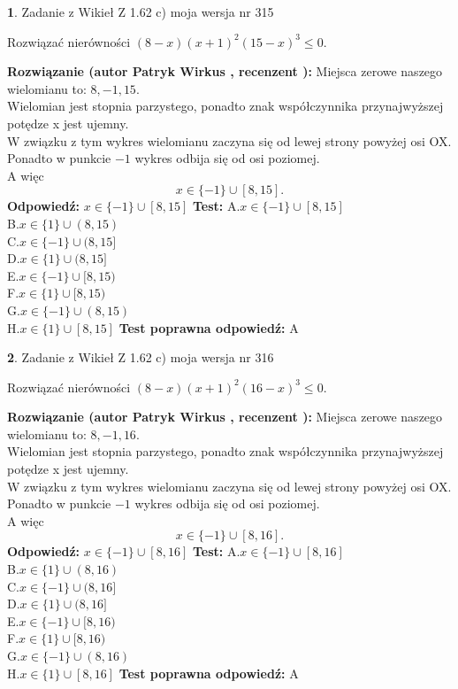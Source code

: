 \documentclass[12pt, a4paper]{article}
\theoremstyle{definition} %
\newtheorem{zad}{}
\newcommand{\zadStart}[1]{\begin{zad}#1\newline}
\newcommand{\zadStop}{\end{zad}}
\newcommand{\rozwStart}[2]{\noindent \textbf{Rozwiązanie (autor #1 , recenzent #2): }\newline}
\newcommand{\rozwStop}{\newline}
\newcommand{\odpStart}{\noindent \textbf{Odpowiedź:}\newline}
\newcommand{\odpStop}{\newline}
\newcommand{\testStart}{\noindent \textbf{Test:}\newline}
\newcommand{\testStop}{\newline}
\newcommand{\kluczStart}{\noindent \textbf{Test poprawna odpowiedź:}\newline}
\newcommand{\kluczStop}{\newline}
\begin{document}
\zadStart{Zadanie z Wikieł Z 1.62 c) moja wersja nr 315}

Rozwiązać nierówności $(8-x)(x+1)^{2}(15-x)^{3}\le0$.
\zadStop
\rozwStart{Patryk Wirkus}{}
Miejsca zerowe naszego wielomianu to: $8, -1, 15$.\\
Wielomian jest stopnia parzystego, ponadto znak współczynnika przy\linebreak najwyższej potędze x jest ujemny.\\ W związku z tym wykres wielomianu zaczyna się od lewej strony powyżej osi OX.\\
Ponadto w punkcie $-1$ wykres odbija się od osi poziomej.\\
A więc $$x \in \{-1\} \cup [8,15].$$
\rozwStop
\odpStart
$x \in \{-1\} \cup [8,15]$
\odpStop
\testStart
A.$x \in \{-1\} \cup [8,15]$\\
B.$x \in \{1\} \cup (8,15)$\\
C.$x \in \{-1\} \cup (8,15]$\\
D.$x \in \{1\} \cup (8,15]$\\
E.$x \in \{-1\} \cup [8,15)$\\
F.$x \in \{1\} \cup [8,15)$\\
G.$x \in \{-1\} \cup (8,15)$\\
H.$x \in \{1\} \cup [8,15]$
\testStop
\kluczStart
A
\kluczStop



\zadStart{Zadanie z Wikieł Z 1.62 c) moja wersja nr 316}

Rozwiązać nierówności $(8-x)(x+1)^{2}(16-x)^{3}\le0$.
\zadStop
\rozwStart{Patryk Wirkus}{}
Miejsca zerowe naszego wielomianu to: $8, -1, 16$.\\
Wielomian jest stopnia parzystego, ponadto znak współczynnika przy\linebreak najwyższej potędze x jest ujemny.\\ W związku z tym wykres wielomianu zaczyna się od lewej strony powyżej osi OX.\\
Ponadto w punkcie $-1$ wykres odbija się od osi poziomej.\\
A więc $$x \in \{-1\} \cup [8,16].$$
\rozwStop
\odpStart
$x \in \{-1\} \cup [8,16]$
\odpStop
\testStart
A.$x \in \{-1\} \cup [8,16]$\\
B.$x \in \{1\} \cup (8,16)$\\
C.$x \in \{-1\} \cup (8,16]$\\
D.$x \in \{1\} \cup (8,16]$\\
E.$x \in \{-1\} \cup [8,16)$\\
F.$x \in \{1\} \cup [8,16)$\\
G.$x \in \{-1\} \cup (8,16)$\\
H.$x \in \{1\} \cup [8,16]$
\testStop
\kluczStart
A
\kluczStop
\end{document}
